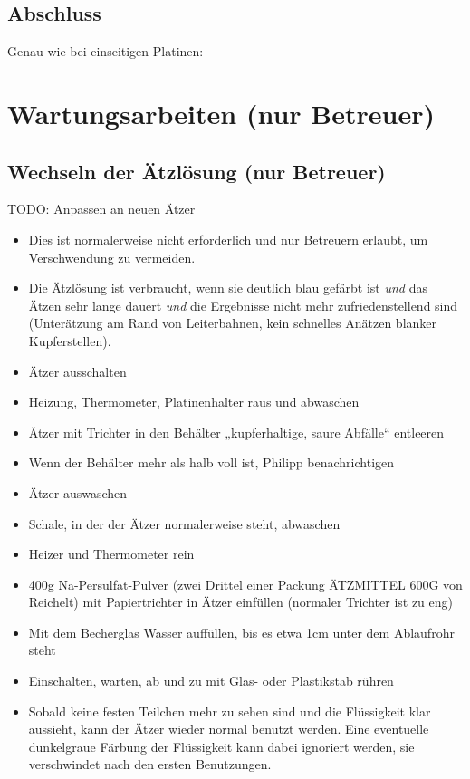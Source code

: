 \documentclass{\basedir/fablab-document}
\begin{document}
\subsection{Abschluss}
Genau wie bei einseitigen Platinen:

\abschluss

\section{Wartungsarbeiten (nur Betreuer)}

\subsection{Wechseln der Ätzlösung (nur Betreuer)}
TODO: Anpassen an neuen Ätzer
\begin{itemize}
\item Dies ist normalerweise nicht erforderlich und nur Betreuern erlaubt, um Verschwendung zu vermeiden.
\item Die Ätzlösung ist verbraucht, wenn sie deutlich blau gefärbt ist \emph{und} das Ätzen sehr lange dauert \emph{und} die Ergebnisse nicht mehr zufriedenstellend sind (Unterätzung am Rand von Leiterbahnen, kein schnelles Anätzen blanker Kupferstellen).
\item Ätzer ausschalten
\end{itemize}
\begin{itemize}
\item Heizung, Thermometer, Platinenhalter raus und abwaschen
\item Ätzer mit Trichter in den Behälter „kupferhaltige, saure Abfälle“ entleeren
\item Wenn der Behälter mehr als halb voll ist, Philipp benachrichtigen
\item Ätzer auswaschen
\item Schale, in der der Ätzer normalerweise steht, abwaschen
\item Heizer und Thermometer rein
\item 400g Na-Persulfat-Pulver (zwei Drittel einer Packung ÄTZMITTEL 600G von Reichelt) mit Papiertrichter in Ätzer einfüllen (normaler Trichter ist zu eng)
\item Mit dem Becherglas Wasser auffüllen, bis es etwa 1cm unter dem Ablaufrohr steht
\item Einschalten, warten, ab und zu mit Glas- oder Plastikstab rühren
\item Sobald keine festen Teilchen mehr zu sehen sind und die Flüssigkeit klar aussieht, kann der Ätzer wieder normal benutzt werden. Eine eventuelle dunkelgraue Färbung der Flüssigkeit kann dabei ignoriert werden, sie verschwindet nach den ersten Benutzungen.
\end{itemize}
\end{document}
